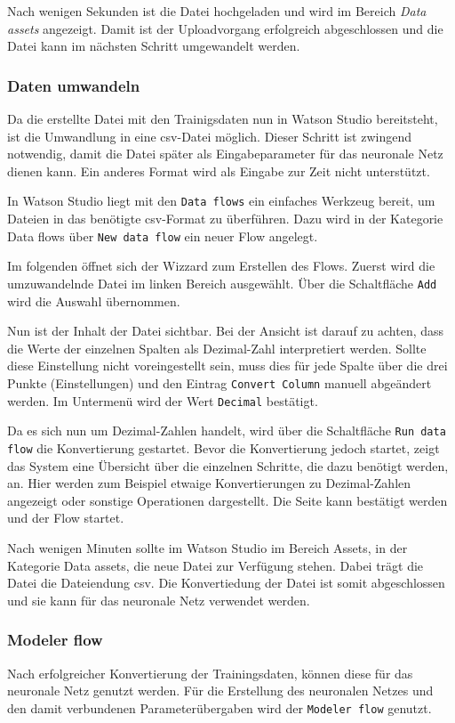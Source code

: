 Nach wenigen Sekunden ist die Datei hochgeladen und wird im Bereich \textit{Data assets} angezeigt. Damit ist der
Uploadvorgang erfolgreich abgeschlossen und die Datei kann im nächsten Schritt umgewandelt werden.

\subsubsection{Daten umwandeln}
Da die erstellte Datei mit den Trainigsdaten nun in Watson Studio bereitsteht, ist die Umwandlung in eine csv-Datei
möglich. Dieser Schritt ist zwingend notwendig, damit die Datei später als Eingabeparameter für das neuronale Netz dienen
kann. Ein anderes Format wird als Eingabe zur Zeit nicht unterstützt.

In Watson Studio liegt mit den \texttt{Data flows} ein einfaches Werkzeug bereit, um Dateien in das benötigte csv-Format
zu überführen. Dazu wird in der Kategorie Data flows über \texttt{New data flow} ein neuer Flow angelegt.

Im folgenden öffnet sich der Wizzard zum Erstellen des Flows. Zuerst wird die umzuwandelnde Datei im linken Bereich
ausgewählt. Über die Schaltfläche \texttt{Add} wird die Auswahl übernommen.

Nun ist der Inhalt der Datei sichtbar. Bei der Ansicht ist darauf zu achten, dass die Werte der einzelnen Spalten als
Dezimal-Zahl interpretiert werden. Sollte diese Einstellung nicht voreingestellt sein, muss dies für jede Spalte über die
drei Punkte (Einstellungen) und den Eintrag \texttt{Convert Column} manuell abgeändert werden. Im Untermenü wird der Wert
\texttt{Decimal} bestätigt.

Da es sich nun um Dezimal-Zahlen handelt, wird über die Schaltfläche \texttt{Run data flow} die Konvertierung gestartet.
Bevor die Konvertierung jedoch startet, zeigt das System eine Übersicht über die einzelnen Schritte, die dazu benötigt
werden, an. Hier werden zum Beispiel etwaige Konvertierungen zu Dezimal-Zahlen angezeigt oder sonstige Operationen
dargestellt. Die Seite kann bestätigt werden und der Flow startet.

Nach wenigen Minuten sollte im Watson Studio im Bereich Assets, in der Kategorie Data assets, die neue Datei zur Verfügung
stehen. Dabei trägt die Datei die Dateiendung csv. Die Konvertiedung der Datei ist somit abgeschlossen und sie kann für
das neuronale Netz verwendet werden.

\subsubsection{Modeler flow}
Nach erfolgreicher Konvertierung der Trainingsdaten, können diese für das neuronale Netz genutzt werden. Für die
Erstellung des neuronalen Netzes und den damit verbundenen Parameterübergaben wird der \texttt{Modeler flow} genutzt.

